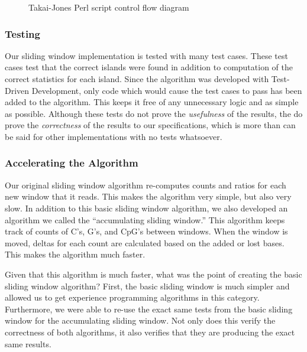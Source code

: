 \documentclass{bioinfo}
\begin{document}
\begin{figure}[H]
  \label{fig:tj-control-flow}
  \caption{Takai-Jones Perl script control flow diagram}
  \begin{dot2tex}[scale=0.3]
    
  \end{dot2tex}
\end{figure}

\subsubsection{Testing}

Our sliding window implementation is tested with many test
cases. These test cases test that the correct islands were found in
addition to computation of the correct statistics for each
island. Since the algorithm was developed with Test-Driven
Development, only code which would cause the test cases to pass has
been added to the algorithm. This keeps it free of any unnecessary
logic and as simple as possible. Although these tests do not prove the
\textit{usefulness} of the results, the do prove the
\textit{correctness} of the results to our specifications, which is
more than can be said for other implementations with no tests
whatsoever.

\subsubsection{Accelerating the Algorithm}

Our original sliding window algorithm re-computes counts and ratios
for each new window that it reads. This makes the algorithm very
simple, but also very slow. In addition to this basic sliding window algorithm, we also developed
an algorithm we called the ``accumulating sliding window.'' This
algorithm keeps track of counts of C's, G's, and CpG's between
windows. When the window is moved, deltas for each count are
calculated based on the added or lost bases. This makes the algorithm
much faster.

Given that this algorithm is much faster, what was the point of
creating the basic sliding window algorithm? First, the basic sliding
window is much simpler and allowed us to get experience programming
algorithms in this category. Furthermore, we were able to re-use the
exact same tests from the basic sliding window for the accumulating
sliding window. Not only does this verify the correctness of both
algorithms, it also verifies that they are producing the exact same
results.
\end{document}
